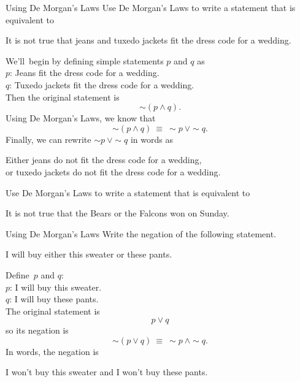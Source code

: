 \begin{example}[https://www.youtube.com/watch?v=98MouQeY1BQ]{Using De Morgan's Laws}
Use De Morgan's Laws to write a statement that is equivalent to
\begin{center}
It is not true that jeans and tuxedo jackets fit the dress code for a wedding.
\end{center}

We'll\sol\ begin by defining simple statements $p$ and $q$ as\\
$p$: Jeans fit the dress code for a wedding.\\
$q$: Tuxedo jackets fit the dress code for a wedding.\\

Then the original statement is \[\sim (p \wedge q).\]
Using De Morgan's Laws, we know that \[\sim (p \wedge q)\ \equiv\ \sim p\ \vee \sim q.\]
Finally, we can rewrite $\sim p\ \vee \sim q$ in words as
\begin{center}
Either jeans do not fit the dress code for a wedding,\\ or tuxedo jackets do not fit the dress code for a wedding.
\end{center}
\end{example}

\begin{try}
Use De Morgan's Laws to write a statement that is equivalent to 
\begin{center}
It is not true that the Bears or the Falcons won on Sunday.
\end{center}
\end{try}

\begin{example}[https://www.youtube.com/watch?v=3ldKuAfCEfw]{Using De Morgan's Laws}
Write the negation of the following statement.
\begin{center}
I will buy either this sweater or these pants.
\end{center}

Define\sol\ $p$ and $q$:\\
$p$: I will buy this sweater.\\
$q$: I will buy these pants.\\

The original statement is \[p \vee q\] so its negation is 
\[\sim (p \vee q)\ \equiv\ \sim p\ \wedge \sim q.\]
In words, the negation is
\begin{center}
I won't buy this sweater and I won't buy these pants.
\end{center}
\end{example}

